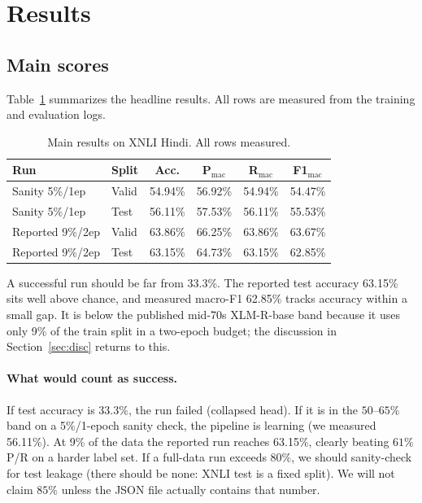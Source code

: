 \documentclass[conference]{IEEEtran}
\newcommand{\ValAcc}{63.86\%}
\newcommand{\ValP}{66.25\%}
\newcommand{\ValR}{63.86\%}
\newcommand{\ValF}{63.67\%}
\newcommand{\TestAcc}{63.15\%}
\newcommand{\TestP}{64.73\%}
\newcommand{\TestR}{63.15\%}
\newcommand{\TestF}{62.85\%}
\begin{document}
\section{Results}
\label{sec:results}

\subsection{Main scores}
Table~\ref{tab:main} summarizes the headline results. All rows are measured from the training and evaluation logs.

\begin{table}[!t]
\centering
\caption{Main results on XNLI Hindi. All rows measured.}
\label{tab:main}
\begin{tabular}{@{}llcccc@{}}
\toprule
\textbf{Run} & \textbf{Split} & \textbf{Acc.} & \textbf{P$_{\mathrm{mac}}$} & \textbf{R$_{\mathrm{mac}}$} & \textbf{F1$_{\mathrm{mac}}$} \\
\midrule
Sanity 5\%/1ep & Valid & 54.94\% & 56.92\% & 54.94\% & 54.47\% \\
Sanity 5\%/1ep & Test & 56.11\% & 57.53\% & 56.11\% & 55.53\% \\
Reported 9\%/2ep & Valid & \ValAcc{} & \ValP{} & \ValR{} & \ValF{} \\
Reported 9\%/2ep & Test & \TestAcc{} & \TestP{} & \TestR{} & \TestF{} \\
\bottomrule
\end{tabular}
\end{table}

A successful run should be far from 33.3\%. The reported test accuracy \TestAcc{} sits well above chance, and measured macro-F1 \TestF{} tracks accuracy within a small gap. It is below the published mid-70s XLM-R-base band because it uses only 9\% of the train split in a two-epoch budget; the discussion in Section~\ref{sec:disc} returns to this.

\paragraph{What would count as success.}
If test accuracy is $33.3\%$, the run failed (collapsed head). If it is in the $50$--$65\%$ band on a 5\%/1-epoch sanity check, the pipeline is learning (we measured 56.11\%). At 9\% of the data the reported run reaches \TestAcc{}, clearly beating $61\%$ P/R on a harder label set. If a full-data run exceeds $80\%$, we should sanity-check for test leakage (there should be none: XNLI test is a fixed split). We will not claim $85\%$ unless the JSON file actually contains that number.
\end{document}

